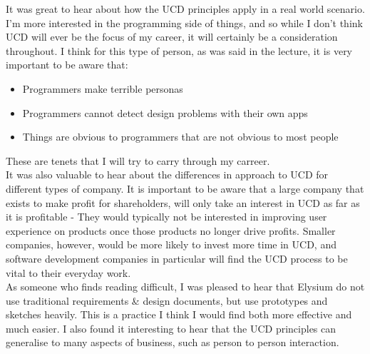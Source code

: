 \documentclass{article}
\begin{document}
\noindent It was great to hear about how the UCD principles apply in a real world scenario. I'm more interested in the programming side of things, and so while I don't think UCD will ever be the focus of my career, it will certainly be a consideration throughout. I think for this type of person, as was said in the lecture, it is very important to be aware that:
\begin{itemize}
    \item Programmers make terrible personas
    \item Programmers cannot detect design problems with their own apps
    \item Things are obvious to programmers that are not obvious to most people
\end{itemize}
These are tenets that I will try to carry through my carreer.
\\\indent It was also valuable to hear about the differences in approach to UCD for different types of company. It is important to be aware that a large company that exists to make profit for shareholders, will only take an interest in UCD as far as it is profitable - They would typically not be interested in improving user experience on products once those products no longer drive profits. Smaller companies, however, would be more likely to invest more time in UCD, and software development companies in particular will find the UCD process to be vital to their everyday work.
\\\indent As someone who finds reading difficult, I was pleased to hear that Elysium do not use traditional requirements \& design documents, but use prototypes and sketches heavily. This is a practice I think I would find both more effective and much easier. I also found it interesting to hear that the UCD principles can generalise to many aspects of business, such as person to person interaction.
\end{document}

